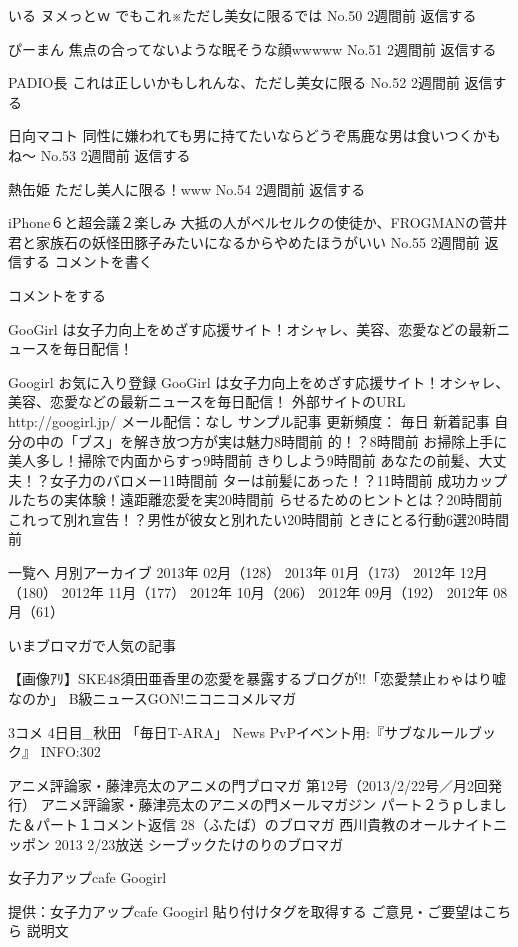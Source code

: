 いる 
ヌメっとｗ
でもこれ※ただし美女に限るでは 
No.50
2週間前
返信する
 
ぴーまん 
焦点の合ってないような眠そうな顔wwwww
No.51
2週間前
返信する
 
PADIO長 
これは正しいかもしれんな、ただし美女に限る
No.52
2週間前
返信する
 
日向マコト 
同性に嫌われても男に持てたいならどうぞ馬鹿な男は食いつくかもね～ 
No.53
2週間前
返信する
 
熱缶姫 
ただし美人に限る！www 
No.54
2週間前
返信する
 
iPhone６と超会議２楽しみ 
大抵の人がベルセルクの使徒か、FROGMANの菅井君と家族石の妖怪田豚子みたいになるからやめたほうがいい 
No.55
2週間前
返信する
コメントを書く
 
コメントをする  
 
GooGirl は女子力向上をめざす応援サイト！オシャレ、美容、恋愛などの最新ニュースを毎日配信！ 
 
Googirl 
お気に入り登録
GooGirl は女子力向上をめざす応援サイト！オシャレ、美容、恋愛などの最新ニュースを毎日配信！
外部サイトのURL
http://googirl.jp/
メール配信：なし  
サンプル記事  
更新頻度： 毎日 
新着記事
自分の中の「ブス」を解き放つ方が実は魅力8時間前
的！？8時間前
お掃除上手に美人多し！掃除で内面からすっ9時間前
きりしよう9時間前
あなたの前髪、大丈夫！？女子力のバロメー11時間前
ターは前髪にあった！？11時間前
成功カップルたちの実体験！遠距離恋愛を実20時間前
らせるためのヒントとは？20時間前
これって別れ宣告！？男性が彼女と別れたい20時間前
ときにとる行動6選20時間前

一覧へ
月別アーカイブ
2013年 02月（128） 
2013年 01月（173） 
2012年 12月（180） 
2012年 11月（177） 
2012年 10月（206） 
2012年 09月（192） 
2012年 08月（61） 

いまブロマガで人気の記事
 
【画像ｱﾘ】SKE48須田亜香里の恋愛を暴露するブログが!!「恋愛禁止ゎゃはり嘘なのか」
B級ニュースGON!ニコニコメルマガ
 
3コメ
4日目_秋田
「毎日T-ARA」 News
PvPイベント用:『サブなルールブック』
INFO:302
 
アニメ評論家・藤津亮太のアニメの門ブロマガ 第12号（2013/2/22号／月2回発行）
アニメ評論家・藤津亮太のアニメの門メールマガジン
パート２うｐしました＆パート１コメント返信
28（ふたば）のブロマガ
西川貴教のオールナイトニッポン 2013 2/23放送
シーブックたけのりのブロマガ
   
女子力アップcafe Googirl

提供：女子力アップcafe Googirl
貼り付けタグを取得する
ご意見・ご要望はこちら
説明文

